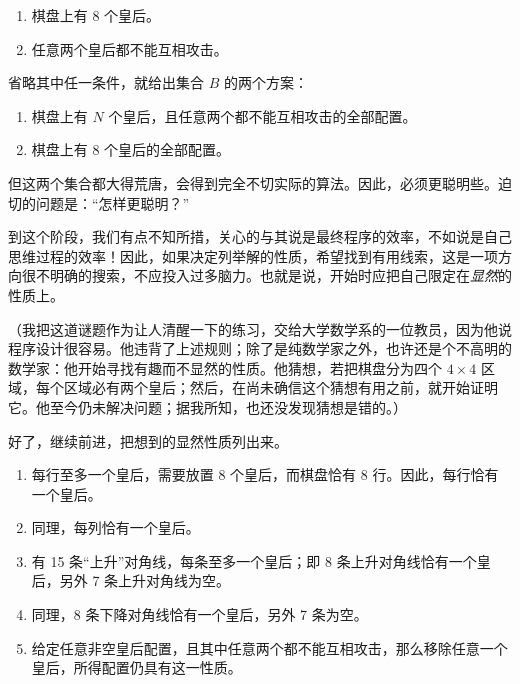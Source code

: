 \documentclass[twoside,11pt,fontset=none]{ctexbook}
\begin{document}
\begin{enumerate}[wide, nosep, label=(\arabic*)]
	\item 棋盘上有 8 个皇后。
	\item 任意两个皇后都不能互相攻击。
\end{enumerate}

省略其中任一条件，就给出集合 $B$ 的两个方案：

\begin{enumerate}[leftmargin=*, itemindent=1.9em, label=B\arabic*:]
	\item \label{en:b1-eight-queens}
	棋盘上有 $N$ 个皇后，且任意两个都不能互相攻击的全部配置。
	\item \label{en:b2-eight-queens}
	棋盘上有 8 个皇后的全部配置。
\end{enumerate}

但这两个集合都大得荒唐，会得到完全不切实际的算法。因此，必须更聪明些。迫切的问题是：“怎样更聪明？”

到这个阶段，我们有点不知所措，关心的与其说是最终程序的效率，不如说是自己思维过程的效率！因此，如果决定列举解的性质，希望找到有用线索，这是一项方向很不明确的搜索，不应投入过多脑力。也就是说，开始时应把自己限定在\textit{显然}的性质上。

（我把这道谜题作为让人清醒一下的练习，交给大学数学系的一位教员，因为他说程序设计很容易。他违背了上述规则；除了是纯数学家之外，也许还是个不高明的数学家：他开始寻找有趣而不显然的性质。他猜想，若把棋盘分为四个 $4\times 4$ 区域，每个区域必有两个皇后；然后，在尚未确信这个猜想有用之前，就开始证明它。他至今仍未解决问题；据我所知，也还没发现猜想是错的。）

好了，继续前进，把想到的显然性质列出来。

\begin{enumerate}[wide, nosep, label=(\alph*)]
	\item \label{en:property-a}
	每行至多一个皇后，需要放置 8 个皇后，而棋盘恰有 8 行。因此，每行恰有一个皇后。
	\item 同理，每列恰有一个皇后。
	\item 有 15 条“上升”对角线，每条至多一个皇后；即 8 条上升对角线恰有一个皇后，另外 7 条上升对角线为空。
	\item 同理，8 条下降对角线恰有一个皇后，另外 7 条为空。
	\item 给定任意非空皇后配置，且其中任意两个都不能互相攻击，那么移除任意一个皇后，所得配置仍具有这一性质。
\end{enumerate}
\end{document}
